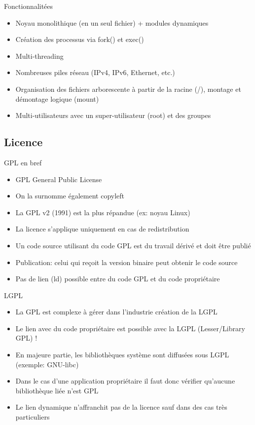\begin{frame}{Fonctionnalitées}{}
  \begin{itemize}
  \item Noyau monolithique (en un seul fichier) + modules dynamiques
  \item Création des processus via fork() et exec()
  \item Multi-threading
  \item Nombreuses piles réseau (IPv4, IPv6, Ethernet, etc.)
  \item Organisation des fichiers arborescente à partir de la racine (/), montage et démontage logique (mount)
  \item Multi-utilisateurs avec un super-utilisateur (root) et des groupes
  \end{itemize}
\end{frame}

\subsection{Licence}

\begin{frame}{GPL en bref}{}
  \begin{itemize}
  \item GPL General Public License
  \item On la surnomme également copyleft
  \item La GPL v2 (1991) est la plus répandue (ex: noyau Linux)
  \item La licence s'applique uniquement en cas de redistribution
  \item Un code source utilisant du code GPL est du travail dérivé et doit être publié
  \item Publication: celui qui reçoit la version binaire peut obtenir le code source
  \item Pas de lien (ld) possible entre du code GPL et du code propriétaire
  \end{itemize}
\end{frame}

\begin{frame}{LGPL}{}
  \begin{itemize}
  \item La GPL est complexe à gérer dans l'industrie \MVRightarrow{} création de la LGPL
  \item Le lien avec du code propriétaire est possible avec la LGPL (Lesser/Library GPL) !
  \item En majeure partie, les bibliothèques système sont diffusées sous LGPL (exemple: GNU-libc)
  \item Dans le cas d'une application propriétaire il faut donc vérifier qu'aucune bibliothèque liée n'est GPL
  \item Le lien dynamique n'affranchit pas de la licence sauf dans des cas très particuliers
  \end{itemize}
\end{frame}

